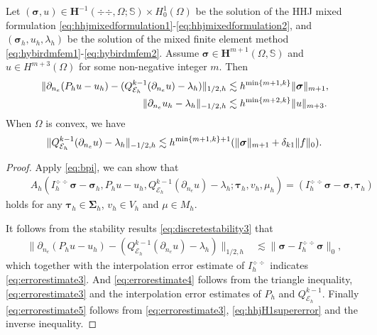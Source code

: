 \begin{theorem}
Let $(\boldsymbol{\sigma} , u)\in \boldsymbol{H}^{-1}(\div\div,\Omega; \mathbb{S})\times H_0^1(\Omega)$ be the solution of the HHJ mixed formulation \eqref{eq:hhjmixedformulation1}-\eqref{eq:hhjmixedformulation2}, and $(\boldsymbol{\sigma}_h,u_h,\lambda_h)$ be the solution of the mixed finite element method \eqref{eq:hybirdmfem1}-\eqref{eq:hybirdmfem2}.
Assume $\boldsymbol{\sigma}\in \boldsymbol{H}^{m+1}(\Omega, \mathbb{S})$ and $u\in H^{m+3}(\Omega)$ for
some non-negative integer $m$.
Then
\begin{align}
\label{eq:errorestimate3}\|\partial_{n_e}(P_hu-u_h)-(Q_{\mathcal{E}_h}^{k-1}(\partial_{n_e}u)-\lambda_h)\|_{1/2,h}&\lesssim h^{\min\{m+1,k\}}\|\boldsymbol\sigma\|_{m+1}, \\
\label{eq:errorestimate4}
\|\partial_{n_e}u_h-\lambda_h\|_{-1/2,h}&\lesssim   h^{\min\{m+2,k\}}\|u\|_{m+3}.
\end{align}
When $\Omega$ is convex, we have
\begin{equation}\label{eq:errorestimate5}
\|Q_{\mathcal{E}_h}^{k-1}(\partial_{n_e}u)-\lambda_h\|_{-1/2,h}\lesssim h^{\min\{m+1,k\}+1}(\|\boldsymbol\sigma\|_{m+1}+\delta_{k1}\|f\|_0).
\end{equation}
\end{theorem}
\begin{proof}
Apply \eqref{eq:bpi}, we can show that
\begin{align*}	
&\quad\; A_h(I_h^{\div\div}\boldsymbol{\sigma}-\boldsymbol{\sigma}_h, P_hu-u_h, Q_{\mathcal{E}_h}^{k-1}(\partial_{n_e}u)-\lambda_h;\boldsymbol{\tau}_h, v_h,\mu_h) =(I_h^{\div\div}\boldsymbol{\sigma}-\boldsymbol{\sigma},\boldsymbol{\tau}_h)
\end{align*}
holds for any $\boldsymbol{\tau}_h\in\boldsymbol{\Sigma}_h$, $v_h\in V_h$ and $\mu\in M_h$.

It follows from	the stability results \eqref{eq:discretestability3} that
\begin{align*}
\|\partial_{n_e}(P_hu-u_h)-(Q_{\mathcal{E}_h}^{k-1}(\partial_{n_e}u)-\lambda_h)\|_{1/2,h}&\lesssim \|\boldsymbol{\sigma}-I_h^{\div\div}\boldsymbol{\sigma}\|_0,
\end{align*}
which together with the interpolation error estimate of $I_h^{\div\div}$ indicates \eqref{eq:errorestimate3}. And \eqref{eq:errorestimate4} follows from the triangle inequality, \eqref{eq:errorestimate3} and the interpolation error estimates of $P_h$ and $Q_{\mathcal{E}_h}^{k-1}$. Finally \eqref{eq:errorestimate5} follows from \eqref{eq:errorestimate3}, \eqref{eq:hhjH1supererror} and the inverse inequality.
\end{proof}


